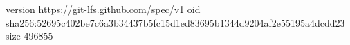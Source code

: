 version https://git-lfs.github.com/spec/v1
oid sha256:52695c402be7c6a3b34437b5fc15d1ed83695b1344d9204af2e55195a4dcdd23
size 496855

